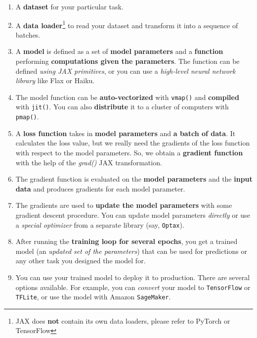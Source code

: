 \documentclass[en,hazy,screen,blue,14pt]{elegantnote}
\begin{document}
\begin{enumerate}
    \item A \textbf{dataset} for your particular task.
    \item A \textbf{data loader}\footnote{JAX does \textbf{not} contain its own data loaders, 
    please refer to PyTorch or TensorFlow} 
    to read your dataset and transform it into a sequence of batches.
    \item A \textbf{model} is defined as a set of \textbf{model parameters} and 
    a \textbf{function} performing \textbf{computations given the parameters}. 
    The function can be defined \textit{using JAX primitives}, 
    or you can use a \textit{high-level neural network library} like Flax or Haiku.
    \item The model function can be \textbf{auto-vectorized} with \texttt{vmap()} 
    and \textbf{compiled} with \texttt{jit()}. 
    You can also \textbf{distribute} it to a cluster of computers with \texttt{pmap()}.
    \item A \textbf{loss function} takes in \textbf{model parameters} and \textbf{a batch of data}. 
    It calculates the loss value, but we really need the gradients of the loss function 
    with respect to the model parameters. 
    So, we obtain a \textbf{gradient function} with the help of the \textit{grad()} JAX transformation.
    \item The gradient function is evaluated on the \textbf{model parameters} and the \textbf{input data} 
    and produces gradients for each model parameter.
    \item The gradients are used to \textbf{update the model parameters} with some gradient descent procedure. 
    You can update model parameters \textit{directly} or use a \textit{special optimizer} from a separate library (say, \texttt{Optax}).
    \item After running the \textbf{training loop for several epochs}, 
    you get a trained model (an \textit{updated set of the parameters}) that can be used 
    for predictions or any other task you designed the model for.
    \item You can use your trained model to deploy it to production. 
    There are several options available. 
    For example, you can \textit{convert} your model to \texttt{TensorFlow} or \texttt{TFLite}, 
    or use the model with Amazon \texttt{SageMaker}.
\end{enumerate}




\printbibliography[heading=bibintoc, title=\ebibname]
\end{document}
